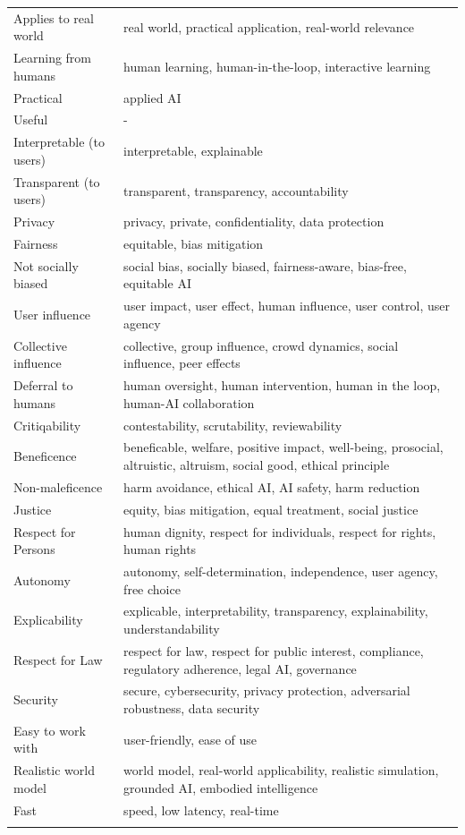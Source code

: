 \documentclass{article}
\begin{document}
\begin{longtable}{|p{5cm}|p{10cm}|}
    Applies to real world & real world, practical application, real-world relevance \\ 
    Learning from humans & human learning, human-in-the-loop, interactive learning \\ 
    Practical & applied AI \\ 
    Useful & - \\ 
    Interpretable (to users) & interpretable, explainable \\ 
    Transparent (to users) & transparent, transparency, accountability \\ 
    Privacy & privacy, private, confidentiality, data protection \\ 
    Fairness & equitable, bias mitigation \\ 
    Not socially biased & social bias, socially biased, fairness-aware, bias-free, equitable AI \\ 
    User influence & user impact, user effect, human influence, user control, user agency \\ 
    Collective influence & collective, group influence, crowd dynamics, social influence, peer effects \\ 
    Deferral to humans & human oversight, human intervention, human in the loop, human-AI collaboration \\ 
    Critiqability & contestability, scrutability, reviewability \\ 
    Beneficence & beneficable, welfare, positive impact, well-being, prosocial, altruistic, altruism, social good, ethical principle \\ 
    Non-maleficence & harm avoidance, ethical AI, AI safety, harm reduction \\ 
    Justice & equity, bias mitigation, equal treatment, social justice \\ 
    Respect for Persons & human dignity, respect for individuals, respect for rights, human rights \\ 
    Autonomy & autonomy, self-determination, independence, user agency, free choice \\ 
    Explicability & explicable, interpretability, transparency, explainability, understandability \\ 
    Respect for Law & respect for law, respect for public interest, compliance, regulatory adherence, legal AI, governance \\ 
    Security & secure, cybersecurity, privacy protection, adversarial robustness, data security \\ 
    Easy to work with & user-friendly, ease of use \\ 
    Realistic world model & world model, real-world applicability, realistic simulation, grounded AI, embodied intelligence \\ 
    Fast & speed, low latency, real-time \\ 
    \hline
    \label{tab:keyword_table}
\end{longtable}
\end{document}
